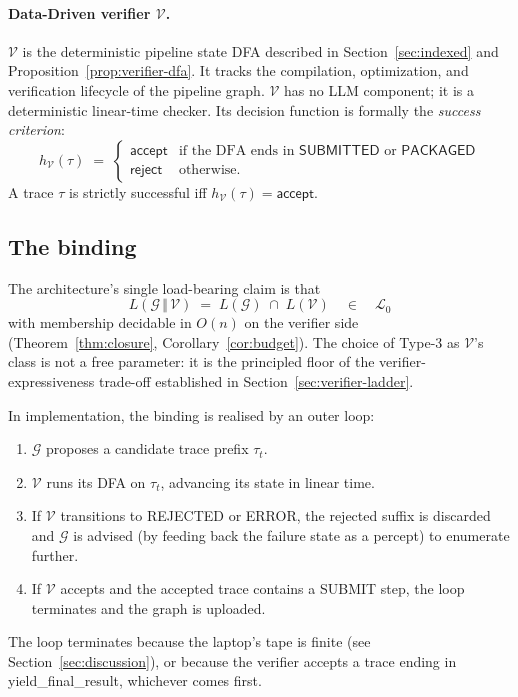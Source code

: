 \paragraph{Data-Driven verifier $\mathcal{V}$.}
$\mathcal{V}$ is the deterministic pipeline state DFA described in
Section~\ref{sec:indexed} and Proposition~\ref{prop:verifier-dfa}.
It tracks the compilation, optimization, and verification lifecycle
of the pipeline graph.
$\mathcal{V}$ has no LLM component; it is a deterministic linear-time
checker.  Its decision function is formally the \emph{success criterion}:
\[
h_\mathcal{V}(\tau) \;=\;
\begin{cases}
\mathsf{accept} & \text{if the DFA ends in } \textsf{SUBMITTED} \text{ or } \textsf{PACKAGED} \\
\mathsf{reject} & \text{otherwise.}
\end{cases}
\]
A trace $\tau$ is strictly successful iff $h_\mathcal{V}(\tau) = \mathsf{accept}$.

\subsection{The binding}

The architecture's single load-bearing claim is that
\[
L(\mathcal{G}\,\Vert\,\mathcal{V}) \;=\; L(\mathcal{G})\;\cap\;
L(\mathcal{V}) \quad\in\quad \mathcal{L}_0
\]
with membership decidable in $O(n)$ on the verifier side
(Theorem~\ref{thm:closure}, Corollary~\ref{cor:budget}).  The
choice of Type-3 as $\mathcal{V}$'s class is not a free parameter:
it is the principled floor of the verifier-expressiveness trade-off
established in Section~\ref{sec:verifier-ladder}.

In implementation, the binding is realised by an outer loop:
\begin{enumerate}
\item $\mathcal{G}$ proposes a candidate trace prefix $\tau_t$.
\item $\mathcal{V}$ runs its DFA on $\tau_t$, advancing its state in
linear time.
\item If $\mathcal{V}$ transitions to \textsf{REJECTED} or \textsf{ERROR},
the rejected suffix is discarded
and $\mathcal{G}$ is advised (by feeding back the failure state
as a percept) to enumerate further.
\item If $\mathcal{V}$ accepts and the accepted trace contains
a \textsf{SUBMIT} step, the loop terminates and
the graph is uploaded.
\end{enumerate}
The loop terminates because the laptop's tape is finite (see
Section~\ref{sec:discussion}), or because the verifier accepts a
trace ending in \textsf{yield\_final\_result}, whichever comes
first.

